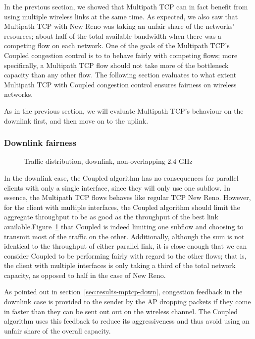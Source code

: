 In the previous section, we showed that Multipath TCP can in fact benefit from
using multiple wireless links at the same time. As expected, we also saw that
Multipath TCP with New Reno was taking an unfair share of the networks'
resources; about half of the total available bandwidth when there was a
competing flow on each network. One of the goals of the Multipath TCP's Coupled
congestion control is to to behave fairly with competing flows; more
specifically, a Multipath TCP flow should not take more of the bottleneck
capacity than any other flow. The following section evaluates to what extent
Multipath TCP with Coupled congestion control ensures fairness on wireless
networks.

As in the previous section, we will evaluate Multipath TCP's behaviour on the
downlink first, and then move on to the uplink.

\subsubsection{Downlink fairness}

\begin{figure}[h]
 \centering
 
 \caption{Traffic distribution, downlink, non-overlapping 2.4 GHz}\label{graph:down-fair}
\end{figure}

In the downlink case, the Coupled algorithm has no consequences for parallel
clients with only a single interface, since they will only use one subflow. In
essence, the Multipath TCP flows behaves like regular TCP New Reno. However, for
the client with multiple interfaces, the Coupled algorithm should limit the
aggregate throughput to be as good as the throughput of the best link
available.\@ Figure~\ref{graph:down-fair} that Coupled is indeed limiting one
subflow and choosing to transmit most of the traffic on the other. Additionally,
although the sum is not identical to the throughput of either parallel link, it
is close enough that we can consider Coupled to be performing fairly with regard
to the other flows; that is, the client with multiple interfaces is only taking
a third of the total network capacity, as opposed to half in the case of New
Reno.


As pointed out in section~\ref{sec:results-mptcp-down}, congestion feedback in
the downlink case is provided to the sender by the AP dropping packets if they
come in faster than they can be sent out out on the wireless channel. The
Coupled algorithm uses this feedback to reduce its aggressiveness and thus avoid
using an unfair share of the overall capacity.


